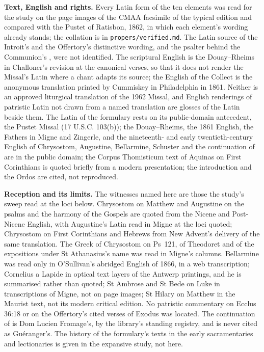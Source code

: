 {\textbf{Text, English and rights.} Every Latin form of the ten elements was read
for the study on the page images of the CMAA facsimile of the typical edition
and compared with the Pustet  of Ratisbon, 1862, in which
each element's wording already stands; the collation is in
\texttt{propers/verified.md}. The Latin source of the Introit's and the
Offertory's distinctive wording, and the psalter behind the Communion's
, were not identified. The scriptural English is the
Douay--Rheims in Challoner's revision at the canonical verses, so that it does
not render the Missal's Latin where a chant adapts its source; the English of
the Collect is the anonymous translation printed by Cummiskey in Philadelphia
in 1861. Neither is an approved liturgical translation of the 1962 Missal, and
English renderings of patristic Latin not drawn from a named translation are
glosses of the Latin beside them. The Latin of the formulary rests on its
public-domain antecedent, the Pustet Missal (17 U.S.C. 103(b)); the
Douay--Rheims, the 1861 English, the Fathers in Migne and Zingerle, and the
nineteenth- and early twentieth-century English of Chrysostom, Augustine,
Bellarmine, Schuster and the continuation of  are in
the public domain; the Corpus Thomisticum text of Aquinas on First Corinthians
is quoted briefly from a modern presentation; the 
introduction and the Ordos are cited, not reproduced.

\textbf{Reception and its limits.} The witnesses named here are those the
study's sweep read at the loci below. Chrysostom on Matthew and Augustine on the
psalms and the harmony of the Gospels are quoted from the Nicene and
Post-Nicene English, with Augustine's Latin read in Migne at the loci quoted;
Chrysostom on First Corinthians and Hebrews from New Advent's delivery of the
same translation. The Greek of Chrysostom on Ps~121, of Theodoret and of the
expositions under St Athanasius's name was read in Migne's columns. Bellarmine
was read only in O'Sullivan's abridged English of 1866, in a web transcription;
Cornelius a Lapide in optical text layers of the Antwerp printings, and he is
summarised rather than quoted; St Ambrose and St Bede on Luke in transcriptions
of Migne, not on page images; St Hilary on Matthew in the Maurist text, not
its modern critical edition. No patristic commentary on Ecclus 36:18 or on the
Offertory's cited verses of Exodus was located. The continuation of  is Dom Lucien Fromage's, by the library's standing registry,
and is never cited as Guéranger's. The history of the formulary's texts in
the early sacramentaries and lectionaries is given in the expansive study, not
here.

}
